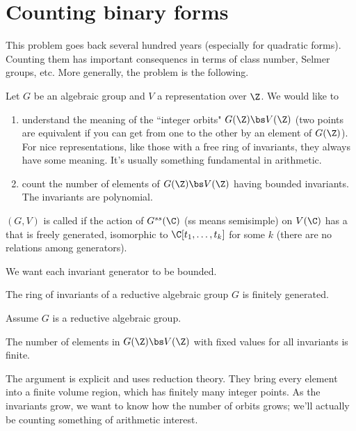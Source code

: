 
\section{Counting binary forms}
This problem goes back several hundred years (especially for quadratic forms). Counting them has important consequencs in terms of class number, Selmer groups, etc. More generally, the problem is the following.

Let $G$ be an algebraic group and $V$ a representation over $\Z$. %
We would like to
\begin{enumerate}
\item
understand the meaning of the ``integer orbits" $G(\Z)\bs V(\Z)$ (two points are equivalent if you can get from one to the other by an element of $G(\Z)$). For nice representations, like those with a free ring of invariants, they always have some meaning. It's usually something fundamental in arithmetic.
\item count the number of elements of $G(\Z)\bs V(\Z)$ having bounded invariants. The invariants are polynomial. %
\end{enumerate}
\begin{df}
$(G,V)$ is called  if the action of $G^{ss}(\C)$ (ss means semisimple) %
on $V(\C)$ has a  that is freely generated, isomorphic to $\C[t_1,\ldots, t_k]$ for some $k$ (there are no relations among generators).
\end{df}
We want each invariant generator to be bounded.

\begin{thm}
The ring of invariants of a reductive algebraic group $G$ is finitely generated.
\end{thm}
\begin{thm}
Assume $G$ is a reductive algebraic group. 

The number of elements in $G(\Z)\bs V(\Z)$ with fixed values for 
all invariants 
is finite.
\end{thm}
The argument is explicit and uses reduction theory. They bring every element into a finite volume region, which has finitely many integer points. As the invariants grow, we want to know how the number of orbits grows; we'll actually be counting something of arithmetic interest.

